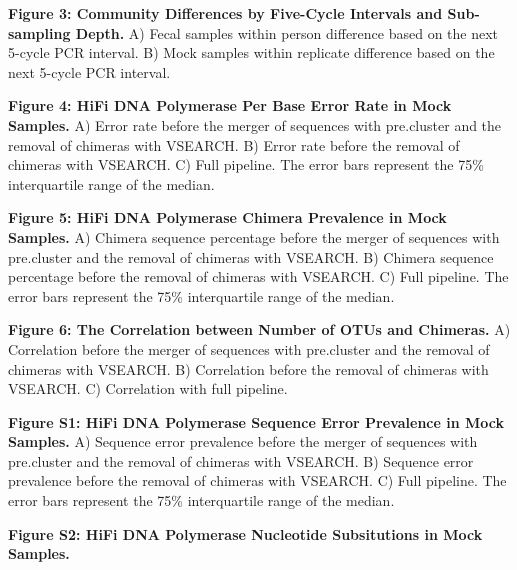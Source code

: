 \documentclass[12pt,]{article}
\begin{document}
\textbf{Figure 3: Community Differences by Five-Cycle Intervals and
Sub-sampling Depth.} A) Fecal samples within person difference based on
the next 5-cycle PCR interval. B) Mock samples within replicate
difference based on the next 5-cycle PCR interval.

\textbf{Figure 4: HiFi DNA Polymerase Per Base Error Rate in Mock
Samples.} A) Error rate before the merger of sequences with pre.cluster
and the removal of chimeras with VSEARCH. B) Error rate before the
removal of chimeras with VSEARCH. C) Full pipeline. The error bars
represent the 75\% interquartile range of the median.

\textbf{Figure 5: HiFi DNA Polymerase Chimera Prevalence in Mock
Samples.} A) Chimera sequence percentage before the merger of sequences
with pre.cluster and the removal of chimeras with VSEARCH. B) Chimera
sequence percentage before the removal of chimeras with VSEARCH. C) Full
pipeline. The error bars represent the 75\% interquartile range of the
median.

\textbf{Figure 6: The Correlation between Number of OTUs and Chimeras.}
A) Correlation before the merger of sequences with pre.cluster and the
removal of chimeras with VSEARCH. B) Correlation before the removal of
chimeras with VSEARCH. C) Correlation with full pipeline.

\newpage

\textbf{Figure S1: HiFi DNA Polymerase Sequence Error Prevalence in Mock
Samples.} A) Sequence error prevalence before the merger of sequences
with pre.cluster and the removal of chimeras with VSEARCH. B) Sequence
error prevalence before the removal of chimeras with VSEARCH. C) Full
pipeline. The error bars represent the 75\% interquartile range of the
median.

\textbf{Figure S2: HiFi DNA Polymerase Nucleotide Subsitutions in Mock
Samples.}
\end{document}
